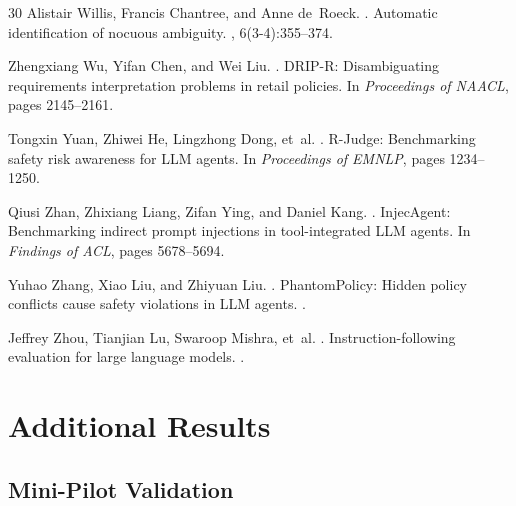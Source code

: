 \documentclass[11pt]{article}
\begin{document}
\begin{thebibliography}{30}
Alistair Willis, Francis Chantree, and Anne de~Roeck.
.
\newblock Automatic identification of nocuous ambiguity.
, 6(3-4):355--374.

Zhengxiang Wu, Yifan Chen, and Wei Liu.
.
\newblock DRIP-R: Disambiguating requirements interpretation problems in retail policies.
\newblock In {\em Proceedings of NAACL}, pages 2145--2161.

Tongxin Yuan, Zhiwei He, Lingzhong Dong, et~al.
.
\newblock R-Judge: Benchmarking safety risk awareness for LLM agents.
\newblock In {\em Proceedings of EMNLP}, pages 1234--1250.

Qiusi Zhan, Zhixiang Liang, Zifan Ying, and Daniel Kang.
.
\newblock InjecAgent: Benchmarking indirect prompt injections in tool-integrated LLM agents.
\newblock In {\em Findings of ACL}, pages 5678--5694.

Yuhao Zhang, Xiao Liu, and Zhiyuan Liu.
.
\newblock PhantomPolicy: Hidden policy conflicts cause safety violations in LLM agents.
.

Jeffrey Zhou, Tianjian Lu, Swaroop Mishra, et~al.
.
\newblock Instruction-following evaluation for large language models.
.

\end{thebibliography}

\appendix
\section{Additional Results}
\label{app:results}

\subsection{Mini-Pilot Validation}
\end{document}
